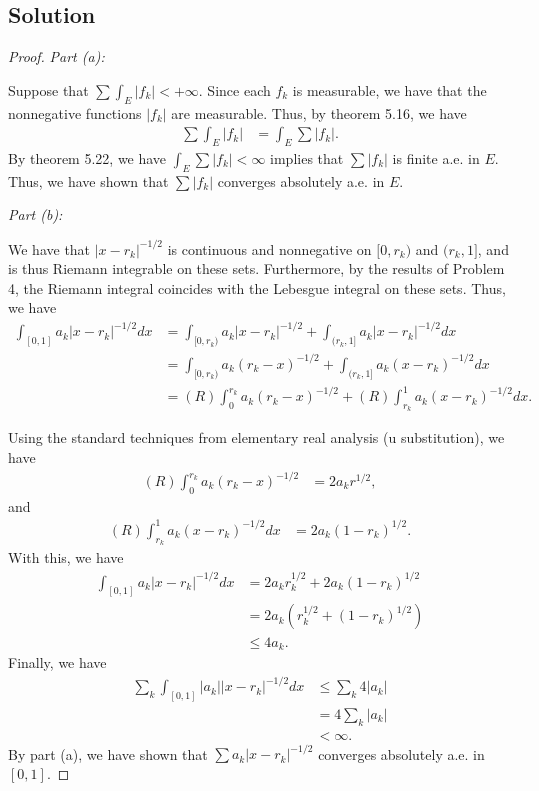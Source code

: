 \documentclass[10pt,a4paper]{article}
\makeatletter
\theoremstyle{theorem}
\newcommand{\proofpart}[2]{%
  \par
  \addvspace{\medskipamount}%
  \noindent\emph{Part #1: #2}\par\nobreak
  \addvspace{\smallskipamount}%
  \@afterheading
}
\theoremstyle{definition}
\makeatother
\begin{document}
\subsection*{Solution}
\begin{proof}
\proofpart{(a)}{} Suppose that $\sum \int_E |f_k| < + \infty$. Since each $f_k$ is measurable, we have that the nonnegative functions $|f_k|$ are measurable. Thus, by theorem 5.16, we have
\begin{align*}
\sum \int_E |f_k| &= \int_E \sum |f_k|.
\end{align*}
By theorem 5.22, we have $\int_E \sum |f_k| < \infty$ implies that $\sum |f_k|$ is finite a.e. in $E$. Thus, we have shown that $\sum |f_k|$ converges absolutely a.e. in $E$.

\proofpart{(b)}{}
We have that $|x - r_k|^{-1/2}$ is continuous and nonnegative on $[0, r_k)$ and $(r_k, 1]$, and is thus Riemann integrable on these sets.  Furthermore, by the results of Problem 4, the Riemann integral coincides with the Lebesgue integral on these sets. Thus, we have
\begin{align*}
\int_{[0, 1]} a_k |x - r_k|^{-1/2} dx &= \int_{[0, r_k)} a_k |x - r_k|^{-1/2}  + \int_{(r_k, 1]} a_k |x - r_k|^{-1/2} dx\\
&= \int_{[0, r_k)} a_k (r_k - x)^{-1/2}  + \int_{(r_k, 1]} a_k (x - r_k)^{-1/2} dx\\
&= (R) \int_0^{r_k} a_k (r_k - x)^{-1/2}  + (R) \int_{r_k}^1 a_k (x - r_k)^{-1/2} dx.
\end{align*}

Using the standard techniques from elementary real analysis (u substitution), we have
\begin{align*}
(R) \int_0^{r_k} a_k (r_k - x)^{-1/2} &= 2a_k r^{1/2},
\end{align*}
and
\begin{align*}
(R) \int_{r_k}^1 a_k (x - r_k)^{-1/2} dx &= 2a_k (1 - r_k)^{1/2}.
\end{align*}
With this, we have
\begin{align*}
\int_{[0, 1]} a_k |x - r_k|^{-1/2} dx &= 2a_k r_k^{1/2} + 2a_k (1 - r_k)^{1/2}\\
&= 2a_k(r_k^{1/2} + (1 - r_k)^{1/2})\\
&\leq 4 a_k.
\end{align*}
Finally, we have
\begin{align*}
\sum_k \int_{[0, 1]} |a_k| |x - r_k|^{-1/2} dx &\leq \sum_k 4 |a_k|\\
&= 4 \sum_k |a_k|\\
&< \infty.
\end{align*}
By part (a), we have shown that $\sum a_k |x - r_k|^{-1/2}$ converges absolutely a.e. in $[0, 1]$.
\end{proof}
\end{document}
